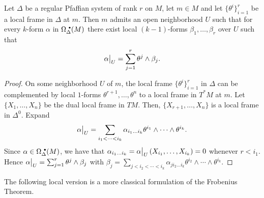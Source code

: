 \begin{lem}[{{\cite[Lem.~4.7.9]{RS1}}}]\label{lem 4.7.9 RS1}
    Let $\Delta$ be a regular Pfaffian system of rank $r$ on $M$, let $m\in M$ and let $\{\theta^i\}_{i=1}^r$ be a local frame in $\Delta$ at $m$. Then $m$ admits an open neighborhood $U$ such that for every $k$-form $\alpha$ in $\Omega^{\smbullet }_\Delta(M)$ there exist local $(k-1)$-forms $\beta_1,\ldots,\beta_r$ over $U$ such that
    \[\restr{\alpha}{U}=\sum_{j=1}^{r}\theta^j\wedge \beta_j.\]
\end{lem}
\begin{proof}
    On some neighborhood $U$ of $m$, the local frame $\{\theta^i\}_{i=1}^r$ in $\Delta$ can be complemented by local $1$-forms $\theta^{r+1}, \ldots,\theta^n$ to a local frame in $T^\ast M$ at $m$. Let $\{X_1,\ldots,X_n\}$ be the dual local frame in $TM$. Then, $\{X_{r+1},\ldots,X_n\}$ is a local frame in $\Delta^0$. Expand
    \[\restr{\alpha}{U}=\sum_{i_1<\cdots<i_k} \alpha_{i_1\ldots i_k}\theta^{i_1}\wedge\cdots\wedge \theta^{i_k}.\]
    Since $\alpha\in\Omega^{\smbullet }_\Delta(M)$, we have that $\alpha_{i_1\ldots i_k}=\restr{\alpha}{U}(X_{i_1},\ldots,X_{i_k})=0$ whenever $r<i_1$. Hence $\restr{\alpha}{U}=\sum_{j=1}^r \theta^j\wedge\beta_j$ with $\beta_j=\sum_{j<i_2<\cdots<i_k} \alpha_{ji_2\ldots i_k}\theta^{i_2}\wedge\cdots\wedge \theta^{i_k}$.
\end{proof}

The following local version is a more classical formulation of the Frobenius Theorem.

